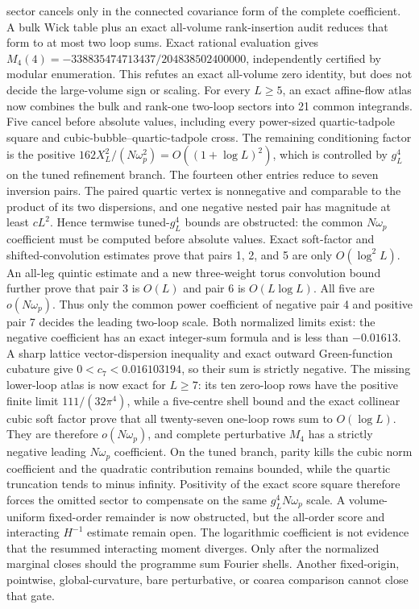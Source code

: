 \documentclass[11pt]{article}
\theoremstyle{definition}
\theoremstyle{remark}
\begin{document}
sector cancels only in the connected covariance form of the complete
coefficient.  A bulk Wick table plus an exact all-volume rank-insertion audit
reduces that form to at most two loop sums.  Exact rational evaluation gives
\(M_4(4)=-338835474713437/204838502400000\), independently certified by modular
enumeration.  This refutes an exact all-volume zero identity, but does not
decide the large-volume sign or scaling.  For every \(L\geq5\), an exact
affine-flow atlas now combines the bulk and rank-one two-loop sectors into 21
common integrands.  Five cancel before absolute values, including every
power-sized quartic-tadpole square and cubic-bubble--quartic-tadpole cross.
The remaining conditioning factor is the positive
\(162X_L^2/(N\omega_p^2)=O((1+\log L)^2)\), which is controlled by \(g_L^4\)
on the tuned refinement branch.  The fourteen other entries reduce to seven
inversion pairs.  The paired quartic vertex is nonnegative and comparable to
the product of its two dispersions, and one negative nested pair has magnitude
at least \(cL^2\).  Hence termwise tuned-\(g_L^4\) bounds are obstructed: the
common \(N\omega_p\) coefficient must be computed before absolute values.
Exact soft-factor and shifted-convolution estimates prove that pairs 1, 2,
and 5 are only \(O(\log^2L)\).  An all-leg quintic estimate and a new
three-weight torus convolution bound further prove that pair 3 is \(O(L)\)
and pair 6 is \(O(L\log L)\).  All five are \(o(N\omega_p)\).  Thus only
the common power coefficient of negative pair 4 and positive pair 7 decides
the leading two-loop scale.  Both normalized limits exist: the negative
coefficient has an exact integer-sum formula and is less than \(-0.01613\).
A sharp lattice vector-dispersion inequality and exact outward Green-function
cubature give \(0<c_7<0.016103194\), so their sum is strictly negative.  The
missing lower-loop atlas is now exact for \(L\geq7\): its ten zero-loop rows
have the positive finite limit \(111/(32\pi^4)\), while a five-centre shell
bound and the exact collinear cubic soft factor prove that all twenty-seven
one-loop rows sum to \(O(\log L)\).  They are therefore
\(o(N\omega_p)\), and complete perturbative \(M_4\) has a strictly negative
leading \(N\omega_p\) coefficient.  On the tuned branch, parity kills the
cubic norm coefficient and the quadratic contribution remains bounded, while
the quartic truncation tends to minus infinity.  Positivity of the exact score
square therefore forces the omitted sector to compensate on the same
\(g_L^4N\omega_p\) scale.  A volume-uniform fixed-order remainder is now
obstructed, but the all-order score and interacting \(H^{-1}\) estimate remain
open.
The logarithmic coefficient is not evidence that the resummed interacting
moment diverges.  Only after the normalized marginal closes should the
programme sum Fourier shells.  Another fixed-origin, pointwise,
global-curvature, bare perturbative, or coarea comparison cannot close that
gate.
\end{document}
